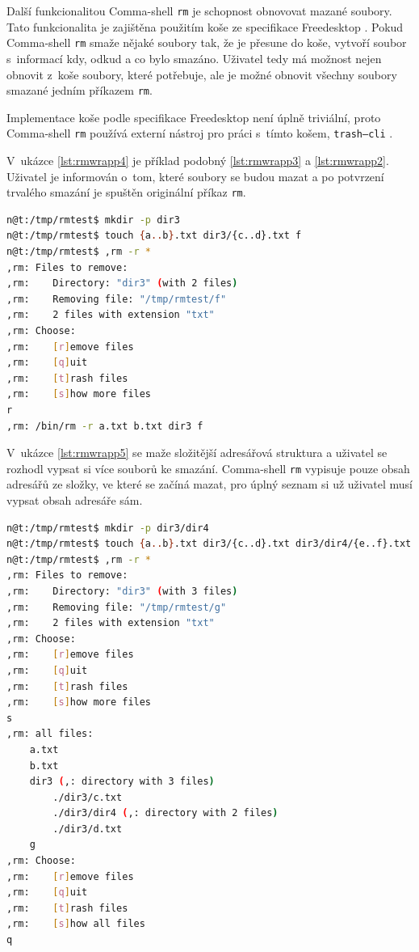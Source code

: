 \documentclass[thesis=M,czech]{FITthesis}[2012/06/26]
\begin{document}
Další funkcionalitou Comma-shell \texttt{rm} je schopnost obnovovat mazané soubory. Tato funkcionalita je zajištěna použitím koše ze specifikace Freedesktop \cite{freedesktop}. Pokud Comma-shell \texttt{rm} smaže nějaké soubory tak, že je přesune do koše, vytvoří soubor s~informací kdy, odkud a co bylo smazáno. Uživatel tedy má možnost nejen obnovit z~koše soubory, které potřebuje, ale je možné obnovit všechny soubory smazané jedním příkazem \texttt{rm}.

Implementace koše podle specifikace Freedesktop není úplně triviální, proto Comma-shell \texttt{rm} používá externí nástroj pro práci s~tímto košem, \texttt{trash--cli} \cite{trashcli}.


V~ukázce \ref{lst:rmwrapp4} je příklad podobný \ref{lst:rmwrapp3} a \ref{lst:rmwrapp2}. Uživatel je informován o~tom, které soubory se budou mazat a po potvrzení trvalého smazání je spuštěn originální příkaz \texttt{rm}.

\noindent
\begin{minipage}{\linewidth}
\begin{lstlisting}[language=bash, caption={rm s~}, label={lst:rmwrapp4}]
n@t:/tmp/rmtest$ mkdir -p dir3
n@t:/tmp/rmtest$ touch {a..b}.txt dir3/{c..d}.txt f
n@t:/tmp/rmtest$ ,rm -r *
,rm: Files to remove:
,rm:    Directory: "dir3" (with 2 files)
,rm:    Removing file: "/tmp/rmtest/f"
,rm:    2 files with extension "txt"
,rm: Choose:
,rm:    [r]emove files
,rm:    [q]uit
,rm:    [t]rash files
,rm:    [s]how more files
r
,rm: /bin/rm -r a.txt b.txt dir3 f
\end{lstlisting}
\end{minipage}


V~ukázce \ref{lst:rmwrapp5} se maže složitější adresářová struktura a uživatel se rozhodl vypsat si více souborů ke smazání. Comma-shell \texttt{rm} vypisuje pouze obsah adresářů ze složky, ve které se začíná mazat, pro úplný seznam si už uživatel musí vypsat obsah adresáře sám.

\noindent
\begin{minipage}{\linewidth}
\begin{lstlisting}[language=bash, caption={rm s~}, label={lst:rmwrapp5}]
n@t:/tmp/rmtest$ mkdir -p dir3/dir4
n@t:/tmp/rmtest$ touch {a..b}.txt dir3/{c..d}.txt dir3/dir4/{e..f}.txt g
n@t:/tmp/rmtest$ ,rm -r *
,rm: Files to remove:
,rm:    Directory: "dir3" (with 3 files)
,rm:    Removing file: "/tmp/rmtest/g"
,rm:    2 files with extension "txt"
,rm: Choose:
,rm:    [r]emove files
,rm:    [q]uit
,rm:    [t]rash files
,rm:    [s]how more files
s
,rm: all files:
    a.txt
    b.txt
    dir3 (,: directory with 3 files)
        ./dir3/c.txt
        ./dir3/dir4 (,: directory with 2 files)
        ./dir3/d.txt
    g
,rm: Choose:
,rm:    [r]emove files
,rm:    [q]uit
,rm:    [t]rash files
,rm:    [s]how all files
q
\end{lstlisting}
\end{minipage}
\end{document}
